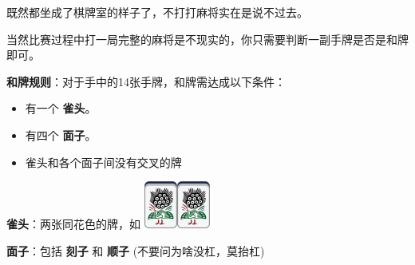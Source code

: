 \documentclass[
	lang=cn,
	color=green
]{elegantbook}
\begin{document}
既然都坐成了棋牌室的样子了，不打打麻将实在是说不过去。

当然比赛过程中打一局完整的麻将是不现实的，你只需要判断一副手牌是否是和牌即可。

\begin{remark}
	\hspace{0.15cm} \textbf{和牌规则}：对于手中的14张手牌，和牌需达成以下条件：

	\begin{itemize}
		\item 有一个 \textbf{雀头}。
		\item 有四个 \textbf{面子}。
		\item 雀头和各个面子间没有交叉的牌
	\end{itemize}

	\hspace{0.15cm} \textbf{雀头}：两张同花色的牌，如 \includegraphics[scale=0.5]{images/mahjong/1s.png}\includegraphics[scale=0.5]{images/mahjong/1s.png}

	\hspace{0.15cm} \textbf{面子}：包括 \textbf{刻子} 和 \textbf{顺子} (不要问为啥没杠，莫抬杠)


\end{remark}
\end{document}
